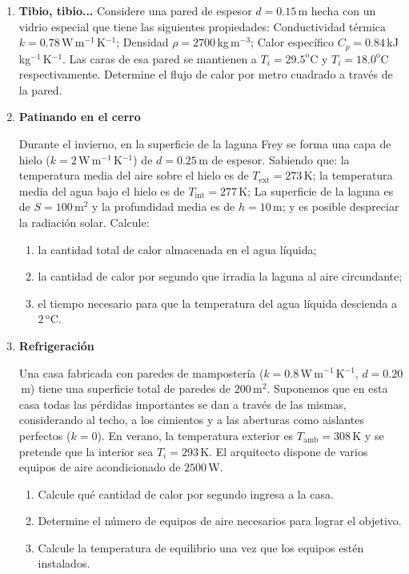 \documentclass[a4paper,12pt]{article}
\begin{document}
\begin{enumerate}
\item{\bf{Tibio, tibio...}}
Considere una pared de espesor $d=0.15$\,m hecha con un vidrio especial que tiene las siguientes propiedades:
Conductividad térmica $k=0.78$\,W\,m$^{-1}$\,K$^{-1}$;
Densidad $\rho = 2700$\,kg\,m$^{-3}$;
Calor específico $C_p = 0.84$\,kJ\,kg$^{-1}$\,K$^{-1}$.
Las caras de esa pared se mantienen a $T_i=29.5^\mathrm{o}$C y $T_i=18.0^\mathrm{o}$C respectivamente. Determine el flujo de calor por metro cuadrado a través de la pared.

\item{\bf{Patinando en el cerro}}

Durante el invierno, en la superficie de la laguna Frey se forma una capa de
hielo ($k=2$\,W\,m$^{-1}$\,K$^{-1}$) de $d=0.25$\,m de espesor. Sabiendo que:
la temperatura media del aire sobre el hielo es de $T_\mathrm{ext}=273$\,K; la
temperatura media del agua bajo el hielo es de $T_\mathrm{int}=277$\,K; La superficie
de la laguna es de $S=100$\,m$^2$ y la profundidad media es de $h=10$\,m; y
es posible despreciar la radiación solar. Calcule:

\begin{enumerate}
\item la cantidad total de calor almacenada en el agua líquida;
\item la cantidad de calor por segundo que irradia la laguna al aire circundante;
\item el tiempo necesario para que la temperatura del agua líquida descienda a $2$\,$^\mathrm{o}$C.
\end{enumerate}


\item{\bf{Refrigeración}}

Una casa fabricada con paredes de mampostería ($k=0.8$\,W\,m$^{-1}$\,K$^{-1}$,
$d=0.20$\,m) tiene una superficie total de paredes de $200$\,m$^2$. Suponemos
que en esta casa todas las pérdidas importantes se dan a través de las mismas,
considerando al techo, a los cimientos y a las aberturas como aislantes
perfectos ($k=0$).  En verano, la temperatura exterior es $T_{\mathrm{amb}}=308$\,K y se
pretende que la interior sea $T_{i}=293$\,K. El arquitecto dispone de varios
equipos de aire acondicionado de $2500$\,W.

\begin{enumerate}
\item Calcule qué cantidad de calor por segundo ingresa a la casa.
\item Determine el número de equipos de aire necesarios para lograr el
objetivo.
\item Calcule la temperatura de equilibrio una vez que los equipos estén
instalados.
\end{enumerate}



\end{enumerate}
\end{document}
